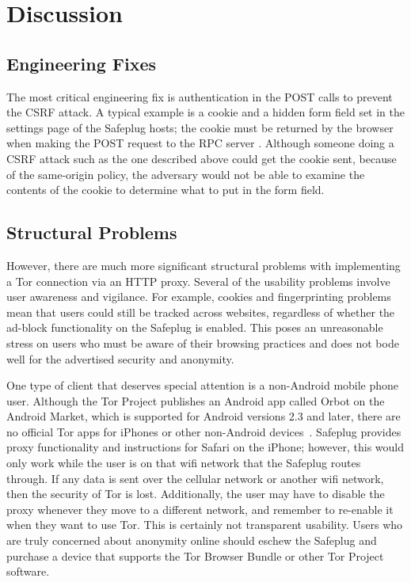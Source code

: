 \documentclass[conference]{IEEEtran}
\begin{document}
\section{Discussion}
\subsection{Engineering Fixes}
The most critical engineering fix is authentication in the POST calls to prevent the CSRF attack.  A typical example is a cookie and a hidden form field set in the settings page of the Safeplug hosts; the cookie must be returned by the browser when making the POST request to the RPC server \cite{csrfdef}.  Although someone doing a CSRF attack such as the one described above could get the cookie sent, because of the same-origin policy, the adversary would not be able to examine the contents of the cookie to determine what to put in the form field.

\subsection{Structural Problems}
However, there are much more significant structural problems with implementing a Tor connection via an HTTP proxy.  Several of the usability problems involve user awareness and vigilance.  For example, cookies and fingerprinting problems mean that users could still be tracked across websites, regardless of whether the ad-block functionality on the Safeplug is enabled.  This poses an unreasonable stress on users who must be aware of their browsing practices and does not bode well for the advertised security and anonymity.

One type of client that deserves special attention is a non-Android mobile phone user.  Although the Tor Project publishes an Android app called Orbot on the Android Market, which is supported for Android versions 2.3 and later, there are no official Tor apps for iPhones or other non-Android devices~\cite{orbot,amorbot}.  Safeplug provides proxy functionality and instructions for Safari on the iPhone; however, this would only work while the user is on that wifi network that the Safeplug routes through.  If any data is sent over the cellular network or another wifi network, then the security of Tor is lost.  Additionally, the user may have to disable the proxy whenever they move to a different network, and remember to re-enable it when they want to use Tor.  This is certainly not transparent usability.  Users who are truly concerned about anonymity online should eschew the Safeplug and purchase a device that supports the Tor Browser Bundle or other Tor Project software.
\end{document}
